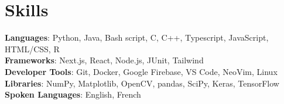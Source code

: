 \documentclass[letterpaper,11pt]{article}
\begin{document}
%
\section{Skills}
 \begin{itemize}[leftmargin=0.15in, label={}]
    \small{\item{
     \textbf{Languages}{: Python, Java, Bash script, C, C++, Typescript, JavaScript, HTML/CSS, R} \\
     \textbf{Frameworks}{: Next.js, React, Node.js, JUnit, Tailwind} \\
     \textbf{Developer Tools}{: Git, Docker, Google Firebase, VS Code, NeoVim, Linux} \\
     \textbf{Libraries}{: NumPy, Matplotlib, OpenCV, pandas, SciPy, Keras, TensorFlow}\\
     \textbf{Spoken Languages}{: English, French}
    }}
 \end{itemize}


\end{document}
